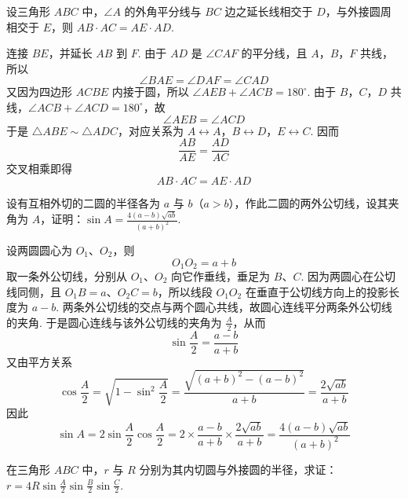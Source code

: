 \begin{problem}
设三角形 \(ABC\) 中，\(\angle A\) 的外角平分线与 \(BC\) 边之延长线相交于 \(D\)，与外接圆周相交于 \(E\)，则 \(AB\cdot AC=AE\cdot AD\).
\end{problem}

\begin{solution}
连接 \(BE\)，并延长 \(AB\) 到 \(F\). 由于 \(AD\) 是 \(\angle CAF\) 的平分线，且 \(A\)，\(B\)，\(F\) 共线，所以
\[
\angle BAE=\angle DAF=\angle CAD
\]
又因为四边形 \(ACBE\) 内接于圆，所以
\(\angle AEB+\angle ACB=180^\circ\). 由于 \(B\)，\(C\)，\(D\) 共线，\(\angle ACB+\angle ACD=180^\circ\)，故
\[
\angle AEB=\angle ACD
\]
于是 \(\triangle ABE\sim\triangle ADC\)，对应关系为 \(A\leftrightarrow A\)，\(B\leftrightarrow D\)，\(E\leftrightarrow C\). 因而
\[
\frac{AB}{AE}=\frac{AD}{AC}
\]
交叉相乘即得
\[
AB\cdot AC=AE\cdot AD
\]
\end{solution}

\begin{problem}
设有互相外切的二圆的半径各为 \(a\) 与 \(b\)（\(a>b\)），作此二圆的两外公切线，设其夹角为 \(A\)，证明：\(\sin A=\frac{4(a-b)\sqrt{ab}}{(a+b)^{2}}\).
\end{problem}

\begin{solution}
设两圆圆心为 \(O_{1}\)、\(O_{2}\)，则
\[
O_{1}O_{2}=a+b
\]
取一条外公切线，分别从 \(O_{1}\)、\(O_{2}\) 向它作垂线，垂足为 \(B\)、\(C\). 因为两圆心在公切线同侧，且 \(O_{1}B=a\)、\(O_{2}C=b\)，所以线段 \(O_{1}O_{2}\) 在垂直于公切线方向上的投影长度为 \(a-b\). 两条外公切线的交点与两个圆心共线，故圆心连线平分两条外公切线的夹角. 于是圆心连线与该外公切线的夹角为 \(\frac{A}{2}\)，从而
\[
\sin\frac{A}{2}=\frac{a-b}{a+b}
\]
又由平方关系
\[
\cos\frac{A}{2}=\sqrt{1-\sin^{2}\frac{A}{2}}=\frac{\sqrt{(a+b)^{2}-(a-b)^{2}}}{a+b}=\frac{2\sqrt{ab}}{a+b}
\]
因此
\[
\sin A=2\sin\frac{A}{2}\cos\frac{A}{2}=2\times\frac{a-b}{a+b}\times\frac{2\sqrt{ab}}{a+b}=\frac{4(a-b)\sqrt{ab}}{(a+b)^{2}}
\]
\end{solution}

\begin{problem}
在三角形 \(ABC\) 中，\(r\) 与 \(R\) 分别为其内切圆与外接圆的半径，求证：\(r=4R\sin\frac{A}{2}\sin\frac{B}{2}\sin\frac{C}{2}\).
\end{problem}

